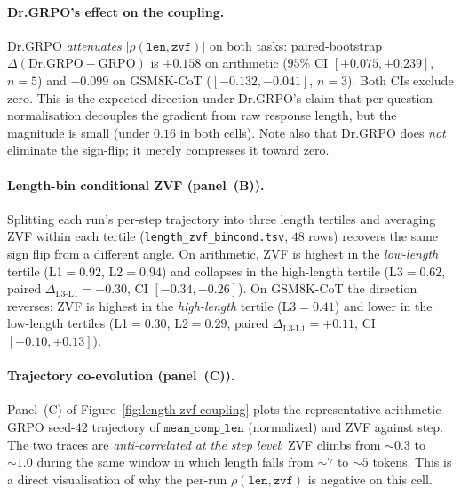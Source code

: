 \documentclass{article}
\begin{document}
\paragraph{Dr.GRPO's effect on the coupling.}
Dr.GRPO \emph{attenuates} $|\rho(\texttt{len},\texttt{zvf})|$ on
both tasks: paired-bootstrap
$\Delta(\text{Dr.GRPO}{-}\text{GRPO})$ is $+0.158$ on arithmetic
($95\%$ CI $[+0.075,+0.239]$, $n{=}5$) and $-0.099$ on GSM8K-CoT
($[-0.132,-0.041]$, $n{=}3$). Both CIs exclude zero. This is the
expected direction under Dr.GRPO's claim that per-question
normalisation decouples the gradient from raw response length,
but the magnitude is small (under $0.16$ in both cells). Note
also that Dr.GRPO does \emph{not} eliminate the sign-flip; it
merely compresses it toward zero.

\paragraph{Length-bin conditional ZVF (panel~(B)).}
Splitting each run's per-step trajectory into three length
tertiles and averaging ZVF within each tertile
(\texttt{length\_zvf\_bincond.tsv}, $48$ rows) recovers the same
sign flip from a different angle. On arithmetic, ZVF is highest
in the \emph{low-length} tertile (L1$=0.92$, L2$=0.94$) and
collapses in the high-length tertile (L3$=0.62$, paired
$\Delta_{\text{L3-L1}}{=}-0.30$, CI $[-0.34,-0.26]$). On
GSM8K-CoT the direction reverses: ZVF is highest in the
\emph{high-length} tertile (L3$=0.41$) and lower in the
low-length tertiles (L1$=0.30$, L2$=0.29$, paired
$\Delta_{\text{L3-L1}}{=}+0.11$, CI $[+0.10,+0.13]$).

\paragraph{Trajectory co-evolution (panel~(C)).}
Panel~(C) of Figure~\ref{fig:length-zvf-coupling} plots the
representative arithmetic GRPO seed-$42$ trajectory of
$\texttt{mean\_comp\_len}$ (normalized) and ZVF against step. The
two traces are \emph{anti-correlated at the step level}: ZVF
climbs from $\sim0.3$ to $\sim1.0$ during the same window in
which length falls from $\sim7$ to $\sim5$ tokens. This is a
direct visualisation of why the per-run
$\rho(\texttt{len}, \texttt{zvf})$ is negative on this cell.
\end{document}
